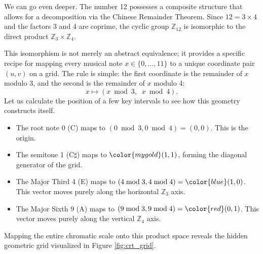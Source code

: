 \documentclass[12pt,letterpaper]{amsart}
\begin{document}
We can go even deeper. The number 12 possesses a composite structure that allows for a decomposition via the Chinese Remainder Theorem. Since $12 = 3 \times 4$ and the factors 3 and 4 are coprime, the cyclic group $\mathbb{Z}_{12}$ is isomorphic to the direct product $\mathbb{Z}_3 \times \mathbb{Z}_4$. 

This isomorphism is not merely an abstract equivalence; it provides a specific recipe for mapping every musical note $x \in \{0, \dots, 11\}$ to a unique coordinate pair $(u, v)$ on a grid. The rule is simple: the first coordinate is the remainder of $x$ modulo 3, and the second is the remainder of $x$ modulo 4:
$$
x \longmapsto (x \bmod 3, \;\; x \bmod 4).
$$
Let us calculate the position of a few key intervals to see how this geometry constructs itself.
\begin{itemize}
    \item The root note 0 (C) maps to $(0 \bmod 3, 0 \bmod 4) = (0,0)$. This is the origin.
    \item The semitone {\color{mygold}1} ({\color{mygold}C$\sharp$}) maps to ${\color{mygold}(1,1)}$, forming the diagonal generator of the grid.
    \item The Major Third {\color{blue}4} ({\color{blue}E}) maps to $(4 \bmod 3, 4 \bmod 4) = {\color{blue}(1, 0)}$. This vector moves purely along the horizontal $\mathbb{Z}_3$ axis.
    \item The Major Sixth {\color{red}9} ({\color{red}A}) maps to $(9 \bmod 3, 9 \bmod 4) = {\color{red}(0, 1)}$. This vector moves purely along the vertical $\mathbb{Z}_4$ axis.
\end{itemize}
Mapping the entire chromatic scale onto this product space reveals the hidden geometric grid visualized in Figure \ref{fig:crt_grid}.
\end{document}

